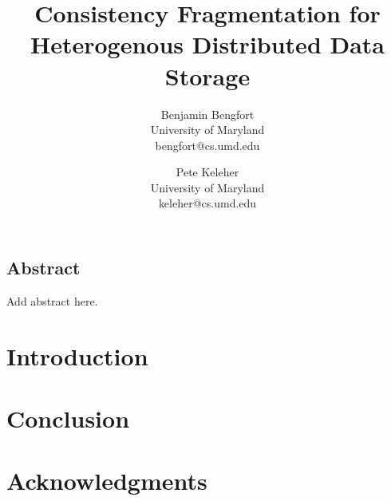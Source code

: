 \documentclass[letterpaper,twocolumn,10pt]{article}
\begin{document}
\date{}

\title{\Large \bf Consistency Fragmentation for Heterogenous Distributed Data Storage}

\author{
{\rm Benjamin Bengfort}\\
University of Maryland\\
bengfort@cs.umd.edu
\and
{\rm Pete Keleher}\\
University of Maryland\\
keleher@cs.umd.edu
} %

\maketitle



\subsection*{Abstract}
Add abstract here.

\section{Introduction}

\section{Conclusion}

\section{Acknowledgments}

{\footnotesize 
}

\end{document}
